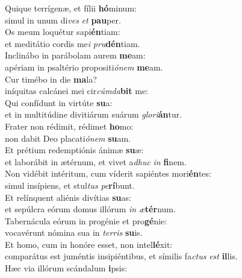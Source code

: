 \evenverse Quique terrígenæ, et fílii \textbf{hó}minum:~\*\\
\evenverse simul in unum di\textit{ves} \textit{et} \textbf{pau}per.\\
\oddverse Os meum loquétur sapi\textbf{én}tiam:~\*\\
\oddverse et meditátio cordis me\textit{i} \textit{pru}\textbf{dén}tiam.\\
\evenverse Inclinábo in parábolam aurem \textbf{me}am:~\*\\
\evenverse apériam in psaltério propositi\textit{ó}\textit{nem} \textbf{me}am.\\
\oddverse Cur timébo in die \textbf{ma}la?~\*\\
\oddverse iníquitas calcánei mei cir\textit{cúm}\textit{da}\textbf{bit} me:\\
\evenverse Qui confídunt in virtúte \textbf{su}a:~\*\\
\evenverse et in multitúdine divitiárum suárum \textit{glo}\textit{ri}\textbf{án}tur.\\
\oddverse Frater non rédimit, rédimet \textbf{ho}mo:~\*\\
\oddverse non dabit Deo placati\textit{ó}\textit{nem} \textbf{su}am.\\
\evenverse Et prétium redemptiónis ánimæ \textbf{su}æ:~\*\\
\evenverse et laborábit in ætérnum, et vivet a\textit{dhuc} \textit{in} \textbf{fi}nem.\\
\oddverse Non vidébit intéritum, cum víderit sapiéntes mori\textbf{én}tes:~\*\\
\oddverse simul insípiens, et stul\textit{tus} \textit{pe}\textbf{rí}bunt.\\
\evenverse Et relínquent aliénis divítias \textbf{su}as:~\*\\
\evenverse et sepúlcra eórum domus illórum \textit{in} \textit{æ}\textbf{tér}num.\\
\oddverse Tabernácula eórum in progénie et pro\textbf{gé}nie:~\*\\
\oddverse vocavérunt nómina sua in \textit{ter}\textit{ris} \textbf{su}is.\\
\evenverse Et homo, cum in honóre esset, non intel\textbf{lé}xit:~\*\\
\evenverse comparátus est juméntis insipiéntibus, et símilis fa\textit{ctus} \textit{est} \textbf{il}lis.\\
\oddverse Hæc via illórum scándalum \textbf{i}psis:~\*\\
